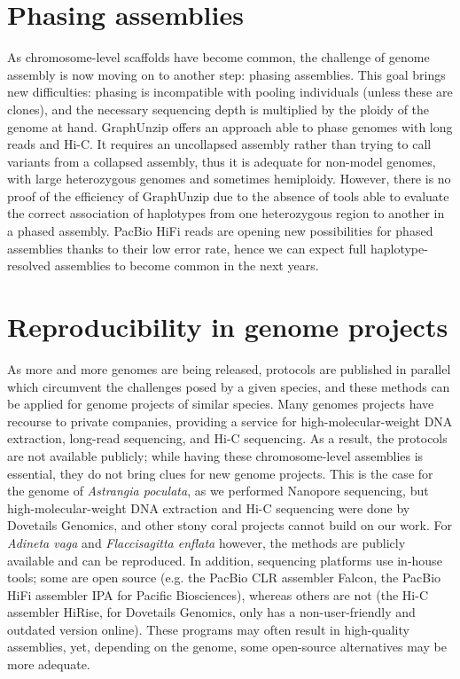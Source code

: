 \section{Phasing assemblies}

As chromosome-level scaffolds have become common, the challenge of genome assembly is now moving on to another step: phasing assemblies. This goal brings new difficulties: phasing is incompatible with pooling individuals (unless these are clones), and the necessary sequencing depth is multiplied by the ploidy of the genome at hand. GraphUnzip offers an approach able to phase genomes with long reads and Hi-C. It requires an uncollapsed assembly rather than trying to call variants from a collapsed assembly, thus it is adequate for non-model genomes, with large heterozygous genomes and sometimes hemiploidy. However, there is no proof of the efficiency of GraphUnzip due to the absence of tools able to evaluate the correct association of haplotypes from one heterozygous region to another in a phased assembly. PacBio HiFi reads are opening new possibilities for phased assemblies thanks to their low error rate, hence we can expect full haplotype-resolved assemblies to become common in the next years. \\

\section{Reproducibility in genome projects}

As more and more genomes are being released, protocols are published in parallel which circumvent the challenges posed by a given species, and these methods can be applied for genome projects of similar species. Many genomes projects have recourse to private companies, providing a service for high-molecular-weight DNA extraction, long-read sequencing, and Hi-C sequencing. As a result, the protocols are not available publicly; while having these chromosome-level assemblies is essential, they do not bring clues for new genome projects. This is the case for the genome of \textit{Astrangia poculata}, as we performed Nanopore sequencing, but high-molecular-weight DNA extraction and Hi-C sequencing were done by Dovetails Genomics, and other stony coral projects cannot build on our work. For \textit{Adineta vaga} and \textit{Flaccisagitta enflata} however, the methods are publicly available and can be reproduced. In addition, sequencing platforms use in-house tools; some are open source (e.g. the PacBio CLR assembler Falcon, the PacBio HiFi assembler IPA for Pacific Biosciences), whereas others are not (the Hi-C assembler HiRise, for Dovetails Genomics, only has a non-user-friendly and outdated version online). These programs may often result in high-quality assemblies, yet, depending on the genome, some open-source alternatives may be more adequate. \\

